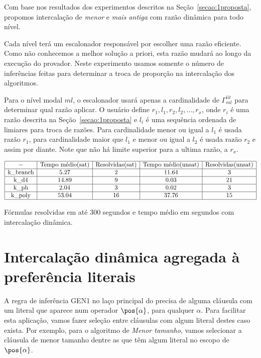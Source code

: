 Com base nos resultados dos experimentos descritos na Seção~\ref{secao:1proposta}, propomos intercalação de \textit{menor} e \textit{mais antiga} com razão dinâmica para todo nível.

Cada nível terá um escalonador responsável por escolher uma razão eficiente. Como não conhecemos a melhor solução a priori, esta razão mudará ao longo da execução do provador. Neste experimento usamos somente o número de inferências feitas para determinar a troca de proporção na intercalação dos algoritmos.

Para o nível modal $ml$, o escalonador usará apenas a cardinalidade de $\Gamma^{lit}_{ml}$ para determinar qual razão aplicar. O usuário define $r_1, l_1, r_2, l_2, \ldots, r_x$, onde $r_i$ é uma razão descrita na Seção~\ref{secao:1proposta} e $l_i$ é uma sequência ordenada de limiares para troca de razões. %
 Para cardinalidade menor ou igual a $l_1$ é usada razão $r_1$, para cardinalidade maior que $l_1$ e menor ou igual a $l_2$ é usada razão $r_2$ e assim por diante. Note que não há limite superior para a ultima razão, a $r_x$.

\begin{table*}[t]
	\[
\begin{array}{|c|c|c|c|c|}
	\hline - & \textnormal{Tempo médio(sat)} & \textnormal{Resolvidas(sat)} & \textnormal{Tempo médio(unsat)} & \textnormal{Resolvidas(unsat)} \\
	
	\hline \textnormal{k\_branch} & 5.27 & 2 & 11.64 & 3 \\
	\hline \textnormal{k\_d4} & 14.89 & 9 & 0.03 & 21 \\
	\hline \textnormal{k\_ph} & 2.04 & 3 & 0.02 & 3 \\
	\hline \textnormal{k\_poly} & 53.04 & 16 & 37.76 & 15 \\
	
	\hline
	
\end{array}
	\]
\caption{Fórmulas resolvidas em até 300 segundos e tempo médio em segundos com intercalação dinâmica.}
\label{table:300threshold1}
\end{table*}

\section{Intercalação dinâmica agregada à preferência literais}
A regra de inferência GEN1 no laço principal do \ksp precisa de alguma cláusula com um literal que aparece num operador $\pos{\alpha}$, para qualquer $\alpha$. Para facilitar esta aplicação, vamos fazer seleção entre cláusulas com algum literal destes caso exista. Por exemplo, para o algoritmo de \textit{Menor tamanho}, vamos selecionar a cláusula de menor tamanho dentre as que têm algum literal no escopo de $\pos{\alpha}$. %

